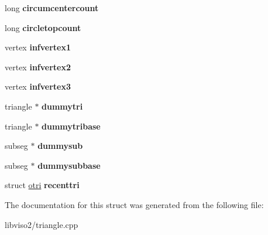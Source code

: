 \begin{DoxyCompactItemize}
\item 
\hypertarget{structmesh_a1ba65d762f34347b9f2dcb6f172636bd}{long {\bfseries circumcentercount}}\label{structmesh_a1ba65d762f34347b9f2dcb6f172636bd}

\item 
\hypertarget{structmesh_a9b54a570701c2bf248cf03438a1affc9}{long {\bfseries circletopcount}}\label{structmesh_a9b54a570701c2bf248cf03438a1affc9}

\item 
\hypertarget{structmesh_ac2d8384391395619b4dbda40b6bbddfd}{vertex {\bfseries infvertex1}}\label{structmesh_ac2d8384391395619b4dbda40b6bbddfd}

\item 
\hypertarget{structmesh_af1d3d858c7cbd4122b978143c0b08c4b}{vertex {\bfseries infvertex2}}\label{structmesh_af1d3d858c7cbd4122b978143c0b08c4b}

\item 
\hypertarget{structmesh_a530fa3d54ca3b95b34fbc233926ac185}{vertex {\bfseries infvertex3}}\label{structmesh_a530fa3d54ca3b95b34fbc233926ac185}

\item 
\hypertarget{structmesh_aeb2991e8af23a60d34462e28cd3881fb}{triangle $\ast$ {\bfseries dummytri}}\label{structmesh_aeb2991e8af23a60d34462e28cd3881fb}

\item 
\hypertarget{structmesh_a93c385f82ea2bf1c0d0b794824bef716}{triangle $\ast$ {\bfseries dummytribase}}\label{structmesh_a93c385f82ea2bf1c0d0b794824bef716}

\item 
\hypertarget{structmesh_ac3956fb994a62f704af23ceb16680ff8}{subseg $\ast$ {\bfseries dummysub}}\label{structmesh_ac3956fb994a62f704af23ceb16680ff8}

\item 
\hypertarget{structmesh_a5c152aa62e1ee91832c176920164c2a7}{subseg $\ast$ {\bfseries dummysubbase}}\label{structmesh_a5c152aa62e1ee91832c176920164c2a7}

\item 
\hypertarget{structmesh_a3fe1c34473c1475118c2253d7cafb17c}{struct \hyperlink{structotri}{otri} {\bfseries recenttri}}\label{structmesh_a3fe1c34473c1475118c2253d7cafb17c}

\end{DoxyCompactItemize}


The documentation for this struct was generated from the following file\+:\begin{DoxyCompactItemize}
\item 
libviso2/triangle.\+cpp\end{DoxyCompactItemize}
